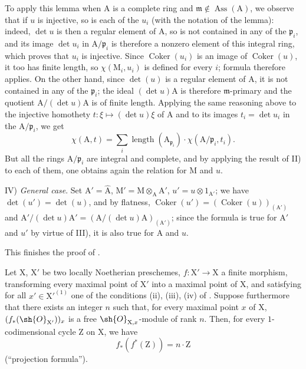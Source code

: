 To apply this lemma when $\mathrm{A}$ is a complete ring and $\mathfrak{m}\notin\operatorname{Ass}(\mathrm{A})$, we observe that if $u$ is injective, so is each of the $u_i$ (with the notation of the lemma): indeed, $\det u$ is then a regular element of $\mathrm{A}$, so is not contained in any of the $\mathfrak{p}_i$, and its image $\det u_i$ in $\mathrm{A}/\mathfrak{p}_i$ is therefore a nonzero element of this integral ring, which proves that $u_i$ is injective.
Since $\operatorname{Coker}(u_i)$ is an image of $\operatorname{Coker}(u)$, it too has finite length, so $\chi(\mathrm{M}_i,u_i)$ is defined for every $i$; formula  therefore applies.
On the other hand, since $\det(u)$ is a regular element of $\mathrm{A}$, it is not contained in any of the $\mathfrak{p}_i$; the ideal $(\det u)\mathrm{A}$ is therefore $\mathfrak{m}$-primary and the quotient $\mathrm{A}/(\det u)\mathrm{A}$ is of finite length.
Applying the same reasoning above to the injective homothety $t:\xi\mapsto(\det u)\xi$ of $\mathrm{A}$ and to its images $t_i=\det u_i$ in the $\mathrm{A}/\mathfrak{p}_i$, we get
\[
  \chi(\mathrm{A},t)=\sum_i\operatorname{length}(\mathrm{A}_{\mathfrak{p}_i})\cdot\chi(\mathrm{A}/\mathfrak{p}_i,t_i).
\]
But all the rings $\mathrm{A}/\mathfrak{p}_i$ are integral and complete, and by applying the result of II) to each of them, one obtains again the relation  for $\mathrm{M}$ and $u$.

IV) \emph{General case}.
Set $\mathrm{A}'=\widehat{\mathrm{A}}$, $\mathrm{M}'=\mathrm{M}\otimes_{\mathrm{A}}\mathrm{A}'$, $u'=u\otimes 1_{\mathrm{A}'}$; we have $\det(u')=\det(u)$, and by flatness, $\operatorname{Coker}(u')=(\operatorname{Coker}(u))_{(\mathrm{A}')}$ and $\mathrm{A}'/(\det u)\mathrm{A}'=(\mathrm{A}/(\det u)\mathrm{A})_{(\mathrm{A}')}$; since the formula  is true for $\mathrm{A}'$ and $u'$ by virtue of III), it is also true for $\mathrm{A}$ and $u$.

This finishes the proof of .

\begin{proposition}[21.10.18]
\label{IV.21.10.18}
Let $\mathrm{X}$, $\mathrm{X}'$ be two locally Noetherian preschemes, $f:\mathrm{X}'\to\mathrm{X}$ a finite morphism, transforming every maximal point of $\mathrm{X}'$ into a maximal point of $\mathrm{X}$, and satisfying for all $x'\in\mathrm{X}'^{(1)}$ one of the conditions (ii), (iii), (iv) of .
Suppose furthermore that there exists an integer $n$ such that, for every maximal point $x$ of $\mathrm{X}$, $(f_*(\sh{O}_{\mathrm{X}'}))_x$ is a free $\sh{O}_{\mathrm{X},x}$-module of rank $n$.
Then, for every $1$-codimensional cycle $\mathrm{Z}$ on $\mathrm{X}$, we have
\[
\label{IV.21.10.18.1}
  f_*(f^*(\mathrm{Z}))=n\cdot\mathrm{Z}
  \tag{21.10.18.1}
\]
(``projection formula'').
\end{proposition}

